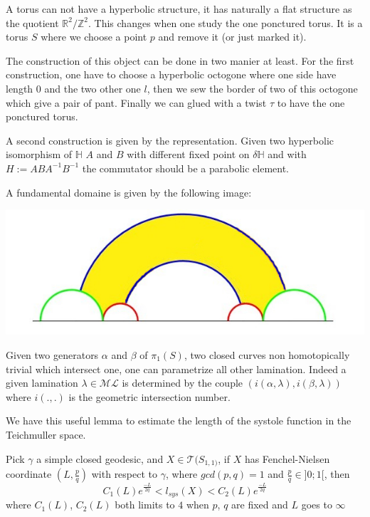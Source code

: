 A torus can not have a hyperbolic structure, it has naturally a flat structure as the quotient $\mathbb{R}^2 / \mathbb{Z}^2$.
This changes when one study the one ponctured torus. It is a torus $S$ where we choose a point $p$ and remove it (or just marked it).

The construction of this object can be done in two manier at least.
For the first construction, one have to choose a hyperbolic octogone where one side have length $0$ and the two other one $l$, then we sew the border of two of this octogone which give a pair of pant. Finally we can glued with a twist $\tau$ to have the one ponctured torus.

A second construction is given by the representation. Given two hyperbolic isomorphism of $\mathbb{H}$ $A$ and $B$ with different fixed point on $\delta \mathbb{H}$ and with $H := ABA^{-1}B^{-1}$ the commutator should be a parabolic element.

A fundamental domaine is given by the following image:


\includegraphics{Image/OnceTorusFundamentalDomaine.jpg}

Given two generators $\alpha$ and $\beta$ of $\pi_1(S)$, two closed curves non homotopically trivial which intersect one, one can parametrize all other lamination.
Indeed a given lamination $\lambda \in \mathcal{ML}$ is determined by the couple $(i(\alpha,\lambda),i(\beta,\lambda))$ where $i(.,.)$ is the geometric intersection number.

We have this useful lemma to estimate the length of the systole function in the Teichmuller space.

\begin{lem}
Pick $\gamma$ a simple closed geodesic, and $X \in \mathcal{T}(S_{1,1)}$, if $X$ has Fenchel-Nielsen coordinate $(L,\frac{p}{q})$ with respect to $\gamma$, where $gcd(p,q)=1$ and $\frac{p}{q} \in ]0;1[$, then \[
C_1(L) e^{\frac{-L}{2q}} < l_{sys}(X) < C_2(L) e^{\frac{-L}{2q}}
\]
where $C_1(L)$, $C_2(L)$ both limits to $4$ when $p$, $q$ are fixed and $L$ goes to $\infty$
\end{lem}

